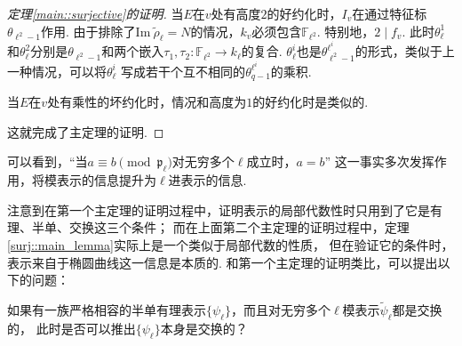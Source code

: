 \begin{proof}[定理\ref{main::surjective}的证明]
    当$E$在$v$处有高度$2$的好约化时，$I_v$在通过特征标$\theta_{\ell^2-1}$作用. 由于排除了$\mathrm{Im}\ \tilde{\rho}_{\ell} = N$的情况，$k_v$必须包含$\mathbb{F}_{\ell^2}$. 特别地，$2\mid f_v$.
    此时$\theta_{\ell}^1$和$\theta_{\ell}^2$分别是$\theta_{\ell^2-1}$和两个嵌入$\tau_1,\tau_2:\mathbb{F}_{\ell^2}\to k_{\ell}$的复合.
    $\theta_{\ell}^{i}$也是$\theta_{\ell^2 - 1}^{\ell^i}$的形式，类似于上一种情况，可以将$\theta_{\ell}^{i}$
    写成若干个互不相同的$\theta_{q-1}^{\ell^i}$的乘积.

    当$E$在$v$处有乘性的坏约化时，情况和高度为$1$的好约化时是类似的.

    这就完成了主定理的证明.
\end{proof}

\begin{crem}
    可以看到，“当$a\equiv b\pmod{\mathfrak{p}_{\ell}}$对无穷多个$\ell$成立时，$a=b$”
    这一事实多次发挥作用，将模表示的信息提升为$\ell$进表示的信息.

    注意到在第一个主定理的证明过程中，证明表示的局部代数性时只用到了它是有理、半单、交换这三个条件；
    而在上面第二个主定理的证明过程中，定理\ref{surj::main_lemma}实际上是一个类似于局部代数的性质，
    但在验证它的条件时，表示来自于椭圆曲线这一信息是本质的.
    和第一个主定理的证明类比，可以提出以下的问题：

    如果有一族严格相容的半单有理表示$\{\psi_{\ell}\}$，而且对无穷多个$\ell$模表示$\tilde{\psi}_{\ell}$都是交换的，
    此时是否可以推出$\{\psi_{\ell}\}$本身是交换的？
\end{crem}
